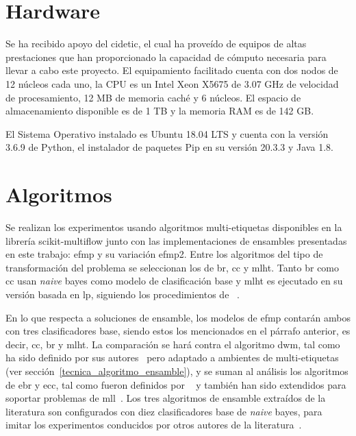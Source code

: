 \section{Hardware}

Se ha recibido apoyo del \acrfull{cidetic}, el cual ha proveído de equipos de
altas prestaciones que han proporcionado la capacidad de cómputo necesaria para
llevar a cabo este proyecto. El equipamiento facilitado cuenta con dos nodos de
12 núcleos cada uno, la CPU es un Intel Xeon X5675 de 3.07 GHz de velocidad de
procesamiento, 12 MB de memoria caché y 6 núcleos. El espacio de almacenamiento
disponible es de 1 TB y la memoria RAM es de 142 GB\@. 

El Sistema Operativo instalado es Ubuntu 18.04 LTS y cuenta con la versión 3.6.9
de Python, el instalador de paquetes Pip en su versión 20.3.3 y Java 1.8.

\section{Algoritmos}
\label{experimentos_algoritmos}

Se realizan los experimentos usando algoritmos multi-etiquetas disponibles en la
librería scikit-multiflow junto con las implementaciones de ensambles
presentadas en este trabajo: \acrfull{efmp} y su variación \acrshort{efmp2}.
Entre los algoritmos del tipo de transformación del problema se seleccionan los
de \acrfull{br}, \acrfull{cc} y \acrfull{mlht}. Tanto \acrshort{br} como
\acrshort{cc} usan \textit{naive} bayes como modelo de clasificación base y
\acrshort{mlht} es ejecutado en su versión basada en \acrfull{lp}, siguiendo los
procedimientos de \citeauthor{read_scalable_2012}~\cite{read_scalable_2012}.

En lo que respecta a soluciones de ensamble, los modelos de \acrshort{efmp}
contarán ambos con tres clasificadores base, siendo estos los mencionados en el
párrafo anterior, es decir, \acrshort{cc}, \acrshort{br} y \acrshort{mlht}. La
comparación se hará contra el algoritmo \acrfull{dwm}, tal como ha sido definido
por sus autores~\cite{kolter_dynamic_2007} pero adaptado a ambientes de
multi-etiquetas (ver sección~\ref{tecnica_algoritmo_ensamble}), y se suman al
análisis los algoritmos de \acrfull{ebr} y \acrfull{ecc}, tal como fueron
definidos por \citeauthor{oza_online_2005}~\cite{oza_online_2005} y también han
sido extendidos para soportar problemas de
\acrshort{mll}~\cite{read_classifier_2011}. Los tres algoritmos de ensamble
extraídos de la literatura son configurados con diez clasificadores base de
\textit{naive} bayes, para imitar los experimentos conducidos por otros autores
de la literatura~\cite{osojnik_multi-label_2017, read_scalable_2012,
	buyukcakir_novel_2018}.

